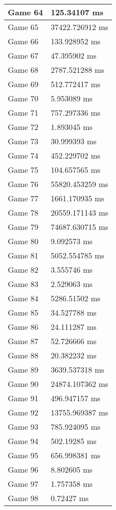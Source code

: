 \begin{multicols}{2}
\begin{tabular}{|l|l|}
	Game 64 & 125.34107 ms \\ \hline
	Game 65 & 37422.726912 ms \\ \hline
	Game 66 & 133.928952 ms \\ \hline
	Game 67 & 47.395902 ms \\ \hline
	Game 68 & 2787.521288 ms \\ \hline
	Game 69 & 512.772417 ms \\ \hline
	Game 70 & 5.953089 ms \\ \hline
	Game 71 & 757.297336 ms \\ \hline
	Game 72 & 1.893045 ms \\ \hline
	Game 73 & 30.999393 ms \\ \hline
	Game 74 & 452.229702 ms \\ \hline
	Game 75 & 104.657565 ms \\ \hline
	Game 76 & 55820.453259 ms \\ \hline
	Game 77 & 1661.170935 ms \\ \hline
	Game 78 & 20559.171143 ms \\ \hline
	Game 79 & 74687.630715 ms \\ \hline
	Game 80 & 9.092573 ms \\ \hline
	Game 81 & 5052.554785 ms \\ \hline
	Game 82 & 3.555746 ms \\ \hline
	Game 83 & 2.529063 ms \\ \hline
	Game 84 & 5286.51502 ms \\ \hline
	Game 85 & 34.527788 ms \\ \hline
	Game 86 & 24.111287 ms \\ \hline
	Game 87 & 52.726666 ms \\ \hline
	Game 88 & 20.382232 ms \\ \hline
	Game 89 & 3639.537318 ms \\ \hline
	Game 90 & 24874.107362 ms \\ \hline
	Game 91 & 496.947157 ms \\ \hline
	Game 92 & 13755.969387 ms \\ \hline
	Game 93 & 785.924095 ms \\ \hline
	Game 94 & 502.19285 ms \\ \hline
	Game 95 & 656.998381 ms \\ \hline
	Game 96 & 8.802605 ms \\ \hline
	Game 97 & 1.757358 ms \\ \hline
	Game 98 & 0.72427 ms \\ \hline

\end{tabular}
\end{multicols}

